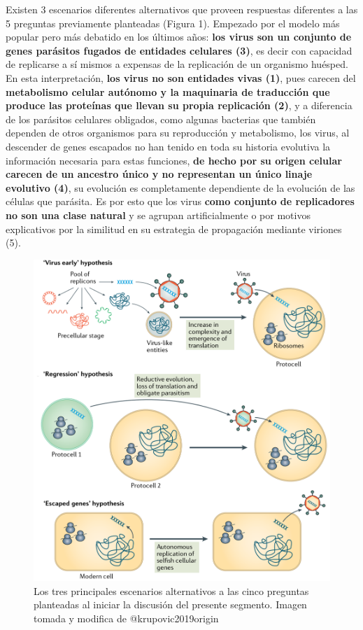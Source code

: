 \documentclass[
  12pt, krantz2,
  spanish,
]{krantz}
\begin{document}
Existen 3 escenarios diferentes alternativos que proveen respuestas diferentes a las 5 preguntas previamente planteadas (Figura 1). Empezado por el modelo más popular pero más debatido en los últimos años: \textbf{los virus son un conjunto de genes parásitos fugados de entidades celulares (3)}, es decir con capacidad de replicarse a sí mismos a expensas de la replicación de un organismo huésped. En esta interpretación, \textbf{los virus no son entidades vivas (1)}, pues carecen del \textbf{metabolismo celular autónomo y la maquinaria de traducción que produce las proteínas que llevan su propia replicación (2)}, y a diferencia de los parásitos celulares obligados, como algunas bacterias que también dependen de otros organismos para su reproducción y metabolismo, los virus, al descender de genes escapados no han tenido en toda su historia evolutiva la información necesaria para estas funciones, \textbf{de hecho por su origen celular carecen de un ancestro único y no representan un único linaje evolutivo (4)}, su evolución es completamente dependiente de la evolución de las células que parásita. Es por esto que los virus \textbf{como conjunto de replicadores no son una clase natural} y se agrupan artificialmente o por motivos explicativos por la similitud en su estrategia de propagación mediante viriones (5).

\begin{figure}
\includegraphics[width=0.8\linewidth]{figures/threeHypo} \caption{Los tres principales escenarios alternativos a las cinco preguntas planteadas al iniciar la discusión del presente segmento. Imagen tomada y modifica de @krupovic2019origin}\label{fig:threehypo}
\end{figure}
\end{document}
